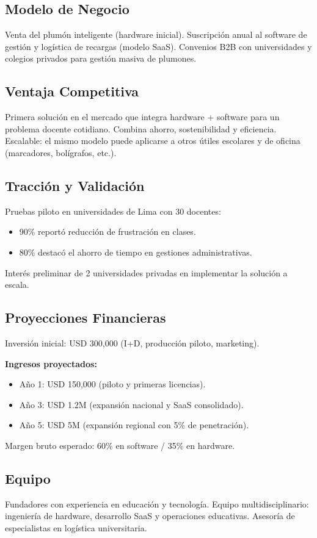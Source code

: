 \subsection*{Modelo de Negocio}
Venta del plumón inteligente (hardware inicial). Suscripción anual al software de gestión y logística de recargas (modelo SaaS). Convenios B2B con universidades y colegios privados para gestión masiva de plumones.

\subsection*{Ventaja Competitiva}
Primera solución en el mercado que integra hardware + software para un problema docente cotidiano. Combina ahorro, sostenibilidad y eficiencia. Escalable: el mismo modelo puede aplicarse a otros útiles escolares y de oficina (marcadores, bolígrafos, etc.).

\subsection*{Tracción y Validación}
Pruebas piloto en universidades de Lima con 30 docentes:
\begin{itemize}
  \item 90\% reportó reducción de frustración en clases.
  \item 80\% destacó el ahorro de tiempo en gestiones administrativas.
\end{itemize}
Interés preliminar de 2 universidades privadas en implementar la solución a escala.

\subsection*{Proyecciones Financieras}
Inversión inicial: USD 300,000 (I+D, producción piloto, marketing).

\textbf{Ingresos proyectados:}
\begin{itemize}
  \item Año 1: USD 150,000 (piloto y primeras licencias).
  \item Año 3: USD 1.2M (expansión nacional y SaaS consolidado).
  \item Año 5: USD 5M (expansión regional con 5\% de penetración).
\end{itemize}
Margen bruto esperado: 60\% en software / 35\% en hardware.

\subsection*{Equipo}
Fundadores con experiencia en educación y tecnología. Equipo multidisciplinario: ingeniería de hardware, desarrollo SaaS y operaciones educativas. Asesoría de especialistas en logística universitaria.

